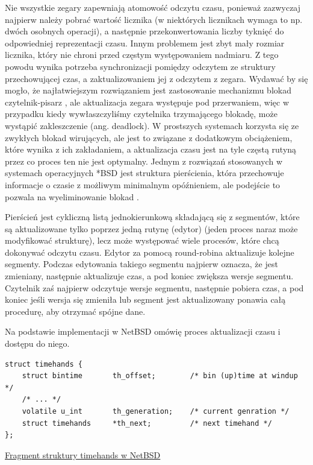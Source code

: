 \documentclass[shortabstract]{iithesis}
\theoremstyle{definition} \newtheorem*{definition}{Definicja}
\theoremstyle{definition} \newtheorem*{example}{Przykład}
\theoremstyle{definition} \newtheorem*{remark}{Uwaga}
\newenvironment{longlisting}{\captionsetup{type=listing}}{}
\begin{document}
Nie wszystkie zegary zapewniają atomowość odczytu czasu, ponieważ zazwyczaj najpierw należy pobrać wartość licznika (w niektórych licznikach wymaga to np. dwóch osobnych operacji), a następnie przekonwertowania liczby tyknięć do odpowiedniej reprezentacji czasu. Innym problemem jest zbyt mały rozmiar licznika, który nie chroni przed częstym występowaniem nadmiaru. Z tego powodu wynika potrzeba synchronizacji pomiędzy odczytem ze struktury przechowującej czas, a zaktualizowaniem jej z odczytem z zegara. Wydawać by się mogło, że najłatwiejszym rozwiązaniem jest zastosowanie mechanizmu blokad czytelnik-pisarz \cite{bib:rwlock}, ale aktualizacja zegara występuje pod przerwaniem, więc w przypadku kiedy wywłaszczyliśmy czytelnika trzymającego blokadę, może wystąpić zakleszczenie (ang. deadlock). W prostszych systemach korzysta się ze zwykłych blokad wirujących, ale jest to związane z dodatkowym obciążeniem, które wynika z ich zakładaniem, a aktualizacja czasu jest na tyle częstą rutyną przez co proces ten nie jest optymalny. Jednym z rozwiązań stosowanych w systemach operacyjnych *BSD jest struktura pierścienia, która przechowuje informacje o czasie z możliwym minimalnym opóźnieniem, ale podejście to pozwala na wyeliminowanie blokad \cite{bib:timecounters}.

Pierścień jest cykliczną listą jednokierunkową składającą się z segmentów, które są aktualizowane tylko poprzez jedną rutynę (edytor) (jeden proces naraz może modyfikować strukturę), lecz może występować wiele procesów, które chcą dokonywać odczytu czasu. Edytor za pomocą round-robina aktualizuje kolejne segmenty. Podczas edytowania takiego segmentu najpierw oznacza, że jest zmieniany, następnie aktualizuje czas, a pod koniec zwiększa wersje segmentu. Czytelnik zaś najpierw odczytuje wersje segmentu, następnie pobiera czas, a pod koniec jeśli wersja się zmieniła lub segment jest aktualizowany ponawia całą procedurę, aby otrzymać spójne dane.

Na podstawie implementacji w NetBSD \cite{bib:netbsdtime} omówię proces aktualizacji czasu i dostępu do niego.

\begin{longlisting}
  \begin{verbatim}
struct timehands {
	struct bintime       th_offset;        /* bin (up)time at windup */
	/* ... */
	volatile u_int       th_generation;    /* current genration */
	struct timehands     *th_next;         /* next timehand */
};
  \end{verbatim}
  \caption{\href{http://bxr.su/NetBSD/sys/kern/kern_tc.c\#95}{Fragment struktury timehands w NetBSD}}
  \label{lst:structth}
\end{longlisting}
\end{document}
